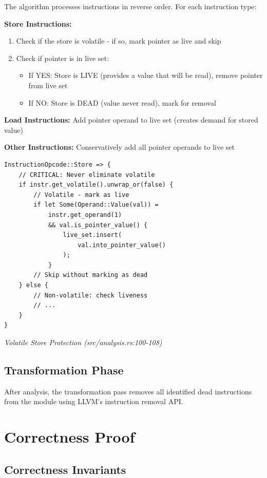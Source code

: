 \documentclass[journal]{IEEEtran}
\begin{document}
The algorithm processes instructions in reverse order. For each instruction type:

\textbf{Store Instructions:}
\begin{enumerate}
\item Check if the store is volatile - if so, mark pointer as live and skip
\item Check if pointer is in live set:
   \begin{itemize}
   \item If YES: Store is LIVE (provides a value that will be read), remove pointer from live set
   \item If NO: Store is DEAD (value never read), mark for removal
   \end{itemize}
\end{enumerate}

\textbf{Load Instructions:}
Add pointer operand to live set (creates demand for stored value)

\textbf{Other Instructions:}
Conservatively add all pointer operands to live set

\begin{verbatim}
InstructionOpcode::Store => {
    // CRITICAL: Never eliminate volatile
    if instr.get_volatile().unwrap_or(false) {
        // Volatile - mark as live
        if let Some(Operand::Value(val)) = 
            instr.get_operand(1)
            && val.is_pointer_value() {
                live_set.insert(
                    val.into_pointer_value()
                );
            }
        // Skip without marking as dead
    } else {
        // Non-volatile: check liveness
        // ...
    }
}
\end{verbatim}
\begin{center}
\textit{Volatile Store Protection (src/analysis.rs:100-108)}
\end{center}

\subsection{Transformation Phase}

After analysis, the transformation pass removes all identified dead instructions from the module using LLVM's instruction removal API.

\section{Correctness Proof}

\subsection{Correctness Invariants}
\end{document}
